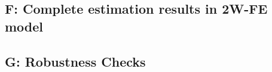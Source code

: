 \setcounter{table}{0}


\renewcommand\thefigure{E\arabic{figure}}
\renewcommand\thetable{E\arabic{table}}



\newpage

\subsection*{F: Complete estimation results in 2W-FE model}
\label{appendix:results}

\setcounter{figure}{0}

\setcounter{table}{0}


\renewcommand\thefigure{F\arabic{figure}}
\renewcommand\thetable{F\arabic{table}}



\newpage

\subsection*{G: Robustness Checks}
\label{rob_checks}

\setcounter{figure}{0}

\setcounter{table}{0}


\renewcommand\thefigure{G\arabic{figure}}
\renewcommand\thetable{G\arabic{table}}

\label{appendix:robustness}




